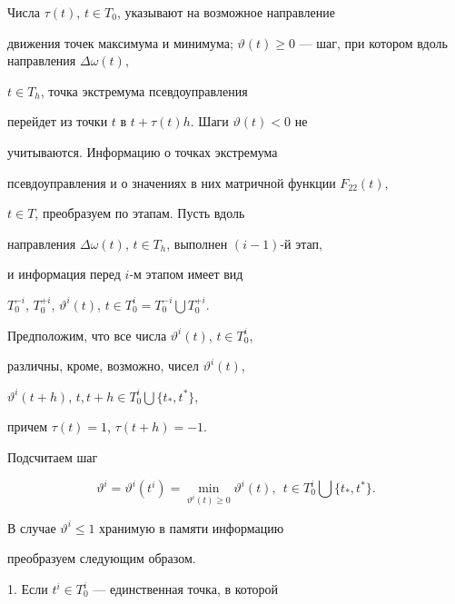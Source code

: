Числа $\tau(t)$, $t \in T_0$, указывают на возможное направление


движения точек максимума и минимума; $\vartheta(t)


\geq 0$ --- шаг, при котором вдоль направления $\Delta \omega(t)$,


$t \in T_h$, точка экстремума псевдоуправления


перейдет из точки $t$ в $t+\tau(t)h$. Шаги $\vartheta(t) < 0$ не


учитываются. Информацию о точках экстремума


псевдоуправления и о значениях в них матричной функции $F_{22}(t)$,


$t \in T$, преобразуем по этапам. Пусть вдоль


направления $\Delta \omega(t)$, $t \in T_h$, выполнен $(i-1)$-й этап,


и информация перед $i$-м этапом имеет вид


$T_0^{-i}$, $T_0^{+i}$, $\vartheta^i(t)$, $t \in T_0^i = T_0^{-i}


\bigcup T_0^{+i}$.





Предположим, что все числа $\vartheta^i(t)$, $t \in T_0^i$,


различны, кроме, возможно, чисел $\vartheta^i(t)$,


$\vartheta^i(t+h)$, $t, t+h \in T_0^i \bigcup \{t_*, t^*\}$,


причем $\tau(t) = 1$, $\tau(t+h) = -1$.





Подсчитаем шаг


\begin{equation}\label{step_i}


\vartheta^i = \vartheta^i(t^i) = \min\limits_{\vartheta^i(t) \geq


0} \vartheta^i(t), \ \ t \in T_0^i \bigcup \{t_*,t^*\}.


\end{equation}





В случае $\vartheta^i \leq 1$ хранимую в памяти информацию


преобразуем следующим образом.





1. Если $t^i \in T_0^i$ --- единственная точка, в которой



